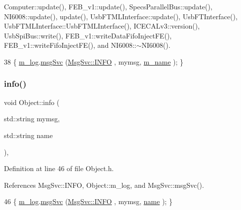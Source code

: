 Computer\+::update(), F\+E\+B\+\_\+v1\+::update(), Specs\+Parallel\+Bus\+::update(), N\+I6008\+::update(), update(), Usb\+F\+T\+M\+L\+Interface\+::update(), Usb\+F\+T\+Interface(), Usb\+F\+T\+M\+L\+Interface\+::\+Usb\+F\+T\+M\+L\+Interface(), I\+C\+E\+C\+A\+Lv3\+::version(), Usb\+Spi\+Bus\+::write(), F\+E\+B\+\_\+v1\+::write\+Data\+Fifo\+Inject\+F\+E(), F\+E\+B\+\_\+v1\+::write\+Fifo\+Inject\+F\+E(), and N\+I6008\+::$\sim$\+N\+I6008().


\begin{DoxyCode}
38 \{ \hyperlink{classObject_a0d269813dd7ac1f24bc143031e2963f2}{m\_log}.\hyperlink{classMsgSvc_ad25f18047920cc59a314e5098259711c}{msgSvc} (\hyperlink{classMsgSvc_ae671eb7301996cd049d2da8a65925926ad2fcf3f3e734fc41ee097cc23670ce51}{MsgSvc::INFO}    , mymsg, \hyperlink{classObject_a8b83c95c705d2c3ba0d081fe1710f48d}{m\_name} ); \}
\end{DoxyCode}
\mbox{\label{classObject_a1ca123253dfd30fc28b156f521dcbdae}} 
\subsubsection{\texorpdfstring{info()}{info()}\hspace{0.1cm}{\footnotesize\ttfamily [2/2]}}
{\footnotesize\ttfamily void Object\+::info (\begin{DoxyParamCaption}\item[{std\+::string}]{mymsg,  }\item[{std\+::string}]{name }\end{DoxyParamCaption})\hspace{0.3cm}{\ttfamily [inline]}, {\ttfamily [inherited]}}



Definition at line 46 of file Object.\+h.



References Msg\+Svc\+::\+I\+N\+FO, Object\+::m\+\_\+log, and Msg\+Svc\+::msg\+Svc().


\begin{DoxyCode}
46 \{ \hyperlink{classObject_a0d269813dd7ac1f24bc143031e2963f2}{m\_log}.\hyperlink{classMsgSvc_ad25f18047920cc59a314e5098259711c}{msgSvc} (\hyperlink{classMsgSvc_ae671eb7301996cd049d2da8a65925926ad2fcf3f3e734fc41ee097cc23670ce51}{MsgSvc::INFO}    , mymsg, \hyperlink{classObject_a300f4c05dd468c7bb8b3c968868443c1}{name} ); \}
\end{DoxyCode}
\mbox{\label{classUsbFTInterface_a5371fe7b447850599eaec81a0ffa2ba0}} 
